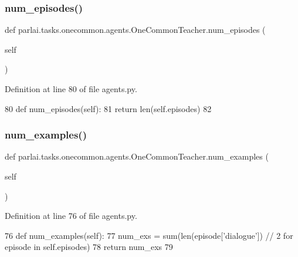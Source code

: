 \subsubsection{\texorpdfstring{num\+\_\+episodes()}{num\_episodes()}}
{\footnotesize\ttfamily def parlai.\+tasks.\+onecommon.\+agents.\+One\+Common\+Teacher.\+num\+\_\+episodes (\begin{DoxyParamCaption}\item[{}]{self }\end{DoxyParamCaption})}



Definition at line 80 of file agents.\+py.


\begin{DoxyCode}
80     \textcolor{keyword}{def }num\_episodes(self):
81         \textcolor{keywordflow}{return} len(self.episodes)
82 
\end{DoxyCode}
\mbox{\label{classparlai_1_1tasks_1_1onecommon_1_1agents_1_1OneCommonTeacher_a192d3b28f7eb54a176c364c992198983}} 
\subsubsection{\texorpdfstring{num\+\_\+examples()}{num\_examples()}}
{\footnotesize\ttfamily def parlai.\+tasks.\+onecommon.\+agents.\+One\+Common\+Teacher.\+num\+\_\+examples (\begin{DoxyParamCaption}\item[{}]{self }\end{DoxyParamCaption})}



Definition at line 76 of file agents.\+py.


\begin{DoxyCode}
76     \textcolor{keyword}{def }num\_examples(self):
77         num\_exs = sum(len(episode[\textcolor{stringliteral}{'dialogue'}]) // 2 \textcolor{keywordflow}{for} episode \textcolor{keywordflow}{in} self.episodes)
78         \textcolor{keywordflow}{return} num\_exs
79 
\end{DoxyCode}
\mbox{\label{classparlai_1_1tasks_1_1onecommon_1_1agents_1_1OneCommonTeacher_a74edf945f0c5a938b987aa72c0f7067d}} 
